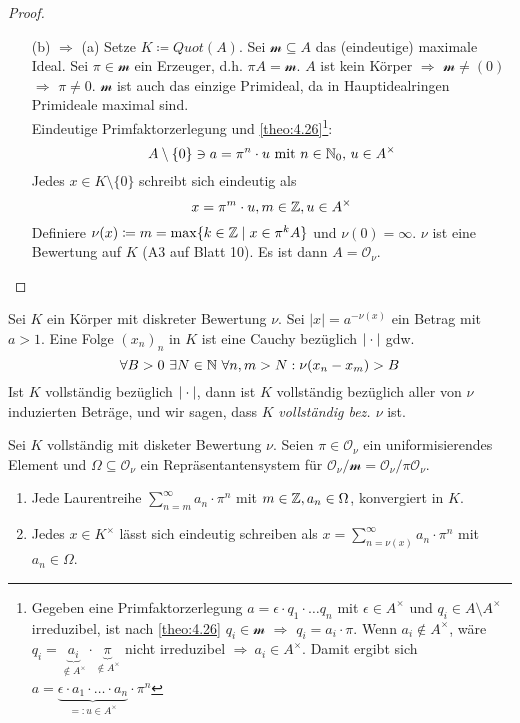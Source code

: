 \documentclass[../main.tex]{subfiles}
\begin{document}
\begin{proof}
\begin{itemize}
        \item[(b) $\Rightarrow$ (a)]
        Setze $K\coloneqq Quot(A)$. Sei $\mathcal{m}\subseteq A$ das (eindeutige) maximale Ideal.
        Sei $\pi\in \mathcal{m}$ ein Erzeuger, d.h. $\pi A = \mathcal{m}$.
        $A$ ist kein Körper $\Longrightarrow$ $\mathcal{m}\neq (0)$ $\Longrightarrow$ $\pi\neq 0$.
        $\mathcal{m}$ ist auch das einzige Primideal, da in Hauptidealringen Primideale maximal sind.\\
        Eindeutige Primfaktorzerlegung und \ref{theo:4.26}\footnote{ Gegeben eine Primfaktorzerlegung $a=\epsilon\cdot q_1\cdot\dots q_n$ mit $\epsilon\in A^\times$ und $q_i\in A\setminus A^\times$ irreduzibel, ist nach \ref{theo:4.26} $q_i\in \mathcal{m}$ $\Rightarrow$ $q_i = a_i \cdot \pi$. Wenn $a_i\notin A^\times$, wäre $q_i = \underbrace{a_i}_{\notin A^\times}\cdot \underbrace{\pi}_{\notin A^\times}$ nicht irreduzibel \Lightning $\Rightarrow\ a_i\in A^\times$. Damit ergibt sich $a=\underbrace{\epsilon\cdot a_1\cdot \dots \cdot a_n}_{=:u\in A^\times} \cdot \pi^{n}$}:
        $$A\setminus\{0\} \ni a = \pi^n\cdot u\text{ mit }n\in \mathbb{N}_0\text{, }u\in A^\times$$
        Jedes $x\in K\setminus\{0\}$ schreibt sich eindeutig als
        $$x = \pi^m\cdot u,m\in \mathbb{Z}, u\in A^\times$$
        Definiere $\nu(x)\coloneqq m = \max \{k\in \mathbb{Z}\mid x\in \pi^kA\}$ und $\nu(0) = \infty$.
        $\nu$ ist eine Bewertung auf $K$ (A3 auf Blatt 10).
        Es ist dann $A=\mathcal{O}_\nu$.
    \end{itemize}
    
\end{proof}

\begin{remark}
    Sei $K$ ein Körper mit diskreter Bewertung $\nu$.
    Sei $|x| = a^{-\nu(x)}$ ein Betrag mit $a>1$.
    Eine Folge $(x_n)_n$ in $K$ ist eine Cauchy bezüglich $|\cdot|$ gdw.
    $$\forall B>0\ \exists N\in \mathbb{N}\ \forall n,m>N: \nu(x_n-x_m)>B$$
    Ist $K$ vollständig bezüglich $|\cdot|$, dann ist $K$ vollständig bezüglich aller von $\nu$ induzierten Beträge, und wir sagen, dass $K$ \emph{vollständig bez. $\nu$} ist.
\end{remark}

\begin{theorem}\label{theo:4.31}
    Sei $K$ vollständig mit disketer Bewertung $\nu$.
    Seien $\pi\in \mathcal{O}_\nu$ ein uniformisierendes Element und $\Omega\subseteq \mathcal{O}_\nu$ ein Repräsentantensystem für $\mathcal{O}_\nu/\mathcal{m} = \mathcal{O}_\nu/\pi \mathcal{O}_\nu$.
    \begin{enumerate}[label=(\alph*)]
        \item Jede Laurentreihe $\sum_{n=m}^\infty a_n\cdot \pi^n$ mit $m\in \mathbb{Z}, a_n\in \Omega$, konvergiert in $K$.
        \item Jedes $x\in K^\times$ lässt sich eindeutig schreiben als $x=\sum_{n = \nu(x)}^\infty a_n\cdot \pi^n$ mit $a_n\in \Omega$.
    \end{enumerate}
\end{theorem}
\end{document}
